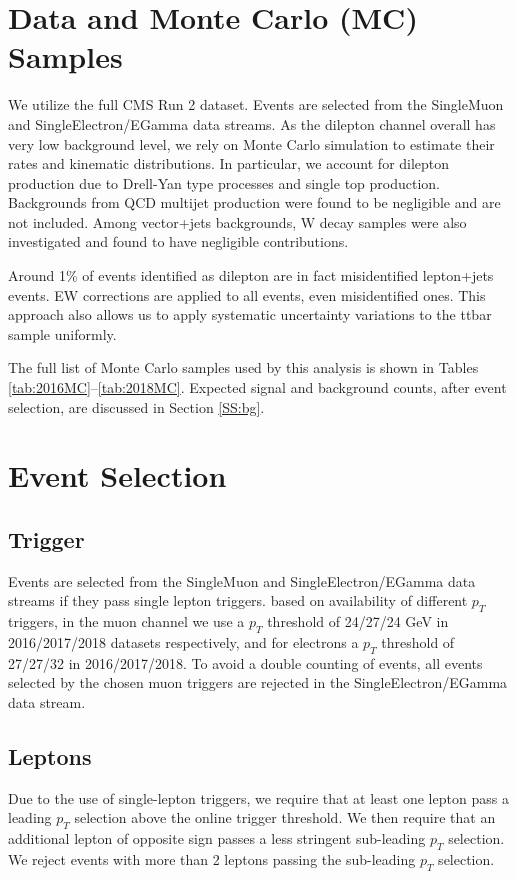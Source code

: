 \section{Data and Monte Carlo (MC) Samples}



We utilize the full CMS Run 2 dataset. Events are selected from the SingleMuon and SingleElectron/EGamma data streams. As the \ttbar dilepton channel  overall has very low background level, we rely on Monte Carlo simulation to estimate their rates and kinematic distributions. In particular, we  account for dilepton production due to Drell-Yan type processes and single top production. Backgrounds from QCD multijet production were found to be negligible and are not included. Among vector+jets backgrounds, W decay samples were also investigated and found to have negligible contributions. 

Around 1\% of events identified as \ttbar dilepton are in fact misidentified \ttbar lepton+jets events.  EW corrections are applied to all \ttbar events,  even  misidentified ones. This approach also allows us to apply systematic uncertainty variations to the ttbar sample uniformly.

The full list of Monte Carlo samples used by this analysis is shown in Tables \ref{tab:2016MC}--\ref{tab:2018MC}.  Expected signal and background counts, after event selection, are discussed in Section \ref{SS:bg}.

\label{S:data}

\clearpage
\section{Event Selection}
\label{S:selection}

\subsection{Trigger}
\label{SS:trigger}
 Events are selected from the SingleMuon and SingleElectron/EGamma data streams if they pass single lepton triggers. based on availability of different $p_T$ triggers, in the muon channel we use a $p_T$ threshold of 24/27/24 GeV  in 2016/2017/2018 datasets respectively, and for electrons a $p_T$ threshold of 27/27/32 in 2016/2017/2018. To avoid a double counting of events, all events selected by the chosen muon triggers are rejected in the SingleElectron/EGamma data stream. 


\subsection{Leptons}
Due to the use of single-lepton triggers, we require that at least one lepton pass a leading $p_T$ selection above the online trigger threshold. We then require that an additional lepton of opposite sign passes a less stringent sub-leading $p_T$ selection. We reject events with more than 2 leptons passing the sub-leading $p_T$ selection.

